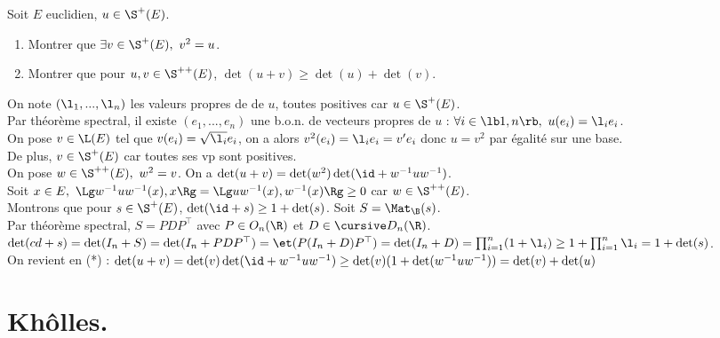 \documentclass[11pt]{article}
\begin{document}
\begin{exercice}{}{}
    Soit $E$ euclidien, $u\in\S^+(E)$.
    \begin{enumerate}
        \item Montrer que $\exists v \in \S^+(E), ~ v^2=u$.
        \item Montrer que pour $u,v\in\S^{++}(E)$, $\det(u+v)\geq \det(u)+\det(v)$.
    \end{enumerate}
    \tcblower
     On note $(\l_1,...,\l_n)$ les valeurs propres de de $u$, toutes positives car $u\in\S^+(E)$.\\
    Par théorème spectral, il existe $(e_1,...,e_n)$ une b.o.n. de vecteurs propres de $u$ : $\forall i \in \lb1,n\rb, ~ u(e_i)=\l_i e_i$.\\
    On pose $v\in\L(E)$ tel que $v(e_i)=\sqrt{\l_i}e_i$, on a alors $v^2(e_i)=\l_i e_i = v'e_i$ donc $u=v^2$ par égalité sur une base.\\
    De plus, $v\in\S^+(E)$ car toutes ses vp sont positives.\\
     On pose $w\in\S^{++}(E), ~ w^2 = v$. On a $\det(u+v)=\det(w^2)\det(\id + w^{-1}uw^{-1})$.\\
    Soit $x\in E, ~ \Lg w^{-1} u w^{-1}(x), x \Rg = \Lg uw^{-1}(x), w^{-1}(x)\Rg \geq 0$ car $w\in\S^{++}(E)$.\\
    Montrons que pour $s\in\S^+(E)$, $\det(\id + s) \geq 1+\det(s)$. Soit $S=\Mat_\B(s)$.\\
    Par théorème spectral, $S=PDP^{\top}$ avec $P\in O_n(\R)$ et $D\in\D_n(\R)$.\\
    $\det(cd+s)=\det(I_n+S)=\det(I_n+PDP^\top)=\et(P(I_n+D)P^\top)=\det(I_n+D)=\prod_{i=1}^n(1+\l_i)\geq 1 + \prod_{i=1}^n\l_i = 1 + \det(s)$.\\
    On revient en (*) : $\det(u+v)=\det(v)\det(\id + w^{-1}uw^{-1})\geq \det(v)(1+\det(w^{-1}uw^{-1}))=\det(v)+\det(u)$
\end{exercice}

\section{Khôlles.}
\end{document}
